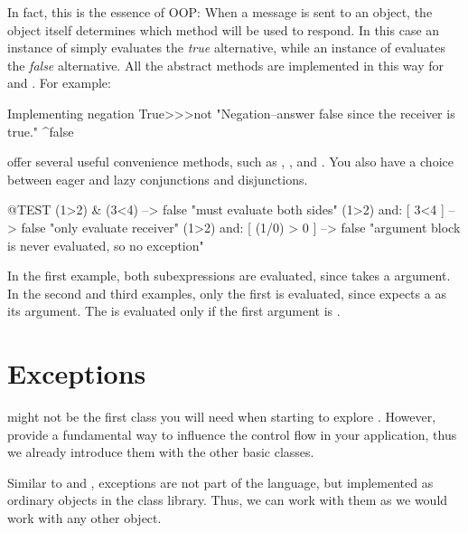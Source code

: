 \documentclass[a4paper,10pt,twoside]{book}
\begin{document}
In fact, this is the essence of OOP:
When a message is sent to an object, the object itself determines which method will be used to respond.
In this case an instance of  simply evaluates the \emph{true} alternative, while an instance of  evaluates the \emph{false} alternative.
All the abstract  methods are implemented in this way for  and .
For example:

\begin{method}{Implementing negation}
True>>>not
    "Negation--answer false since the receiver is true."
    ^false
\end{method}

 offer several useful convenience methods, such as , , and .
You also have a choice between eager and lazy conjunctions and disjunctions.

\begin{code}{@TEST}
(1>2) & (3<4)              --> false    "must evaluate both sides"
(1>2) and: [ 3<4 ]        --> false    "only evaluate receiver"
(1>2) and: [ (1/0) > 0 ] --> false    "argument block is never evaluated, so no exception"
\end{code}

In the first example, both  subexpressions are evaluated, since  takes a  argument.
In the second and third examples, only the first is evaluated, since  expects a  as its argument.
The  is evaluated only if the first argument is .


\section{Exceptions}

 might not be the first class you will need when starting to explore \sq. 
However,  provide a fundamental way to influence the control flow in your application, thus we already introduce them with the other basic classes.

Similar to  and , exceptions are not part of the language, but implemented as ordinary objects in the class library. 
Thus, we can work with them as we would work with any other object.
\end{document}
